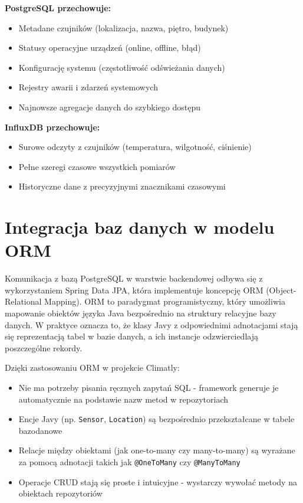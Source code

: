 \documentclass[a4paper,12pt,openany]{book}
\begin{document}
\textbf{PostgreSQL przechowuje:}
\begin{itemize}[noitemsep,topsep=0pt]
\item Metadane czujników (lokalizacja, nazwa, piętro, budynek)
\item Statusy operacyjne urządzeń (online, offline, błąd)
\item Konfigurację systemu (częstotliwość odświeżania danych)
\item Rejestry awarii i zdarzeń systemowych
\item Najnowsze agregacje danych do szybkiego dostępu
\end{itemize}
\vspace{10pt}
\textbf{InfluxDB przechowuje:}
\begin{itemize}[noitemsep,topsep=0pt]
\item Surowe odczyty z czujników (temperatura, wilgotność, ciśnienie)
\item Pełne szeregi czasowe wszystkich pomiarów
\item Historyczne dane z precyzyjnymi znacznikami czasowymi
\end{itemize}

\section{Integracja baz danych w modelu ORM}

Komunikacja z bazą PostgreSQL w warstwie backendowej odbywa się z wykorzystaniem Spring Data JPA, która implementuje koncepcję ORM (Object-Relational Mapping). ORM to paradygmat programistyczny, który umożliwia mapowanie obiektów języka Java bezpośrednio na struktury relacyjne bazy danych. W praktyce oznacza to, że klasy Javy z odpowiednimi adnotacjami stają się reprezentacją tabel w bazie danych, a ich instancje odzwierciedlają poszczególne rekordy.

Dzięki zastosowaniu ORM w projekcie Climatly:
\begin{itemize}[noitemsep,topsep=2pt]
\item Nie ma potrzeby pisania ręcznych zapytań SQL - framework generuje je automatycznie na podstawie nazw metod w repozytoriach
\item Encje Javy (np. \texttt{Sensor}, \texttt{Location}) są bezpośrednio przekształcane w tabele bazodanowe
\item Relacje między obiektami (jak one-to-many czy many-to-many) są wyrażane za pomocą adnotacji takich jak \texttt{@OneToMany} czy \texttt{@ManyToMany}
\item Operacje CRUD stają się proste i intuicyjne - wystarczy wywołać metody na obiektach repozytoriów
\end{itemize}
\end{document}
